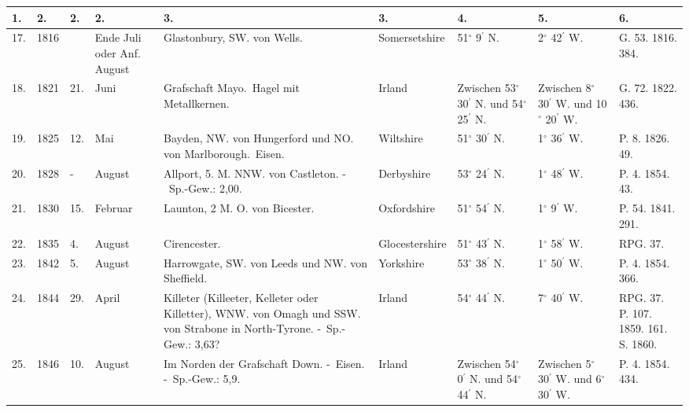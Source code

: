 \documentclass[a4paper, 8pt, oneside, polutonikogreek, german]{article}
\begin{document}
\clearpage
\begin{landscape}
\begin{table}[!ht]
    \centering
    \footnotesize
    \begin{tabular}{|p{5mm}|p{9mm}|p{5mm}|p{15mm}|p{48mm}|p{25mm}|p{12mm}|p{12mm}|p{11mm}|}
    \hline
        1. & 2. & 2. & 2. & 3. & 3. & 4. & 5. & 6. \\ \hline
        17. & 1816 & ~ & Ende Juli oder Anf. August & Glastonbury, SW. von Wells. & Somersetshire & 51$^\circ$ 9$^\prime$ N. & 2$^\circ$ 42$^\prime$ W. & G. 53. 1816. 384. \\ \hline        
        18. & 1821 & 21. & Juni & Grafschaft Mayo. Hagel mit Metallkernen. & Irland & Zwischen 53$^\circ$ 30$^\prime$ N. und 54$^\circ$ 25$^\prime$ N. & Zwischen 8$^\circ$ 30$^\prime$ W. und 10$^\circ$ 20$^\prime$ W. & G. 72. 1822. 436. \\ \hline
        19. & 1825 & 12. & Mai & Bayden, NW. von Hungerford und NO. von Marlborough. Eisen. & Wiltshire & 51$^\circ$ 30$^\prime$ N. & 1$^\circ$ 36$^\prime$ W. & P. 8. 1826. 49. \\ \hline
        20. & 1828 & - & August & Allport, 5. M. NNW. von Castleton. - Sp.-Gew.: 2,00. & Derbyshire & 53$^\circ$ 24$^\prime$ N. & 1$^\circ$ 48$^\prime$ W. & P. 4. 1854. 43. \\ \hline
        21. & 1830 & 15. & Februar & Launton, 2 M. O. von Bicester. & Oxfordshire & 51$^\circ$ 54$^\prime$ N. & 1$^\circ$ 9$^\prime$ W. & P. 54. 1841. 291. \\ \hline
        22. & 1835 & 4. & August & Cirencester. & Glocestershire & 51$^\circ$ 43$^\prime$ N. & 1$^\circ$ 58$^\prime$ W. & RPG. 37. \\ \hline
        23. & 1842 & 5. & August & Harrowgate, SW. von Leeds und NW. von Sheffield. & Yorkshire & 53$^\circ$ 38$^\prime$ N. & 1$^\circ$ 50$^\prime$ W. & P. 4. 1854. 366. \\ \hline
        24. & 1844 & 29. & April & Killeter (Killeeter, Kelleter oder Killetter), WNW. von Omagh und SSW. von Strabone in North-Tyrone. - Sp.-Gew.: 3,63? & Irland & 54$^\circ$ 44$^\prime$ N. & 7$^\circ$ 40$^\prime$ W. & RPG. 37. P. 107. 1859. 161. S. 1860. \\ \hline
        25. & 1846 & 10. & August & Im Norden der Grafschaft Down. - Eisen. - Sp.-Gew.: 5,9. & Irland & Zwischen 54$^\circ$ 0$^\prime$ N. und 54$^\circ$ 44$^\prime$ N. & Zwischen 5$^\circ$ 30$^\prime$ W. und 6$^\circ$ 30$^\prime$ W. & P. 4. 1854. 434. \\ \hline
    \end{tabular}
\end{table}
\end{landscape}
\end{document}
